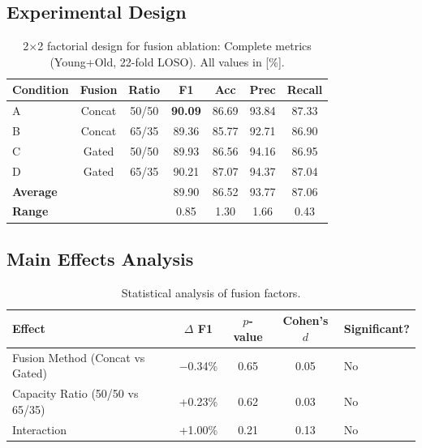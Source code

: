 \documentclass{article}
\begin{document}
\subsection{Experimental Design}

\begin{table}[htbp]
    \centering
    \caption{2$\times$2 factorial design for fusion ablation: Complete metrics (Young+Old, 22-fold LOSO). All values in [\%].}
    \label{tab:factorial}
    \small
    \begin{tabular}{lcccccc}
        \toprule
        \textbf{Condition} & \textbf{Fusion} & \textbf{Ratio} & \textbf{F1} & \textbf{Acc} & \textbf{Prec} & \textbf{Recall} \\
        \midrule
        A & Concat & 50/50 & \textbf{90.09} & 86.69 & 93.84 & 87.33 \\
        B & Concat & 65/35 & 89.36 & 85.77 & 92.71 & 86.90 \\
        C & Gated & 50/50 & 89.93 & 86.56 & 94.16 & 86.95 \\
        D & Gated & 65/35 & 90.21 & 87.07 & 94.37 & 87.04 \\
        \midrule
        \multicolumn{3}{l}{\textbf{Average}} & 89.90 & 86.52 & 93.77 & 87.06 \\
        \multicolumn{3}{l}{\textbf{Range}} & 0.85 & 1.30 & 1.66 & 0.43 \\
        \bottomrule
    \end{tabular}
\end{table}

\subsection{Main Effects Analysis}

\begin{table}[htbp]
    \centering
    \caption{Statistical analysis of fusion factors.}
    \label{tab:fusion_stats}
    \small
    \begin{tabular}{lcccl}
        \toprule
        \textbf{Effect} & \textbf{$\Delta$ F1} & \textbf{$p$-value} & \textbf{Cohen's $d$} & \textbf{Significant?} \\
        \midrule
        Fusion Method (Concat vs Gated) & $-$0.34\% & 0.65 & 0.05 & No \\
        Capacity Ratio (50/50 vs 65/35) & +0.23\% & 0.62 & 0.03 & No \\
        Interaction & +1.00\% & 0.21 & 0.13 & No \\
        \bottomrule
    \end{tabular}
\end{table}
\end{document}
